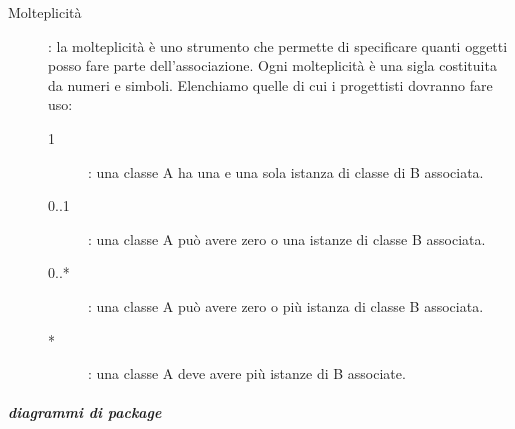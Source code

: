 \documentclass[../../norme-di-progetto.tex]{subfiles}
\begin{document}
\begin{description}
  \item [Molteplicità]: la molteplicità è uno strumento che permette di specificare quanti oggetti posso fare parte dell'associazione. Ogni molteplicità è una sigla costituita da numeri e simboli. Elenchiamo quelle di cui i progettisti dovranno fare uso:
  \begin{description}
    \item [1]: una classe A ha una e una sola istanza di classe di B associata.
    \item [0..1]: una classe A può avere zero o una istanze di classe B associata.
    \item [0..*]: una classe A può avere zero o più istanza di classe B associata.
    \item [*]: una classe A deve avere più istanze di B associate.
  \end{description}
\end{description}

\subparagraph{diagrammi di package}%
\label{subp:diagrammi_di_package}
\end{document}
